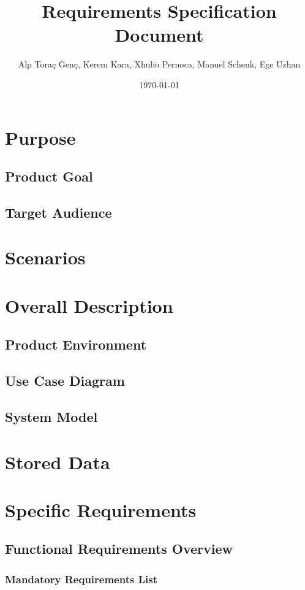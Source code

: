 \documentclass[10pt,a4paper]{report}
\title{Requirements Specification Document}
\author{Alp Toraç Genç, Kerem Kara, Xhulio Pernoca, Manuel Schenk, Ege Uzhan}
\date{\today}
\begin{document}
\maketitle
\tableofcontents

\chapter{Purpose}
\section{Product Goal}
\section{Target Audience}
\chapter{Scenarios}

\chapter{Overall Description}
\section{Product Environment}
\section{Use Case Diagram}
\section{System Model}

\chapter{Stored Data}

\chapter{Specific Requirements}
\section{Functional Requirements Overview}
\subsection{Mandatory Requirements List}
\end{document}
